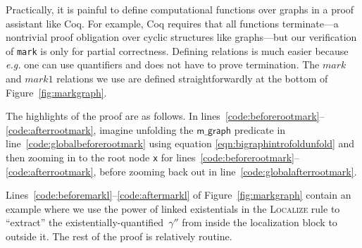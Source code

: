 \documentclass[acmsmall,screen]{acmart}
\newcommand{\li}[1]{{\texttt{\small #1}}}
\newcommand\hide[1]{}
\newcommand{\p}[1]{\ensuremath{\mathsf{#1}}} \newcommand{\m}[1]{\ensuremath{\mathit{#1}}} \newcommand{\ma}[1]{\ensuremath{\mathcal{#1}}} \let\ramify\lightning
\newcommand{\infrulestyle}[1]{\textsc{#1}}
\begin{document}
Practically, it is painful to define computational functions over graphs in a proof assistant like Coq.  For example, Coq requires that all functions terminate---a nontrivial proof obligation over cyclic structures like graphs---but our verification of \li{mark} is only for partial correctness.  Defining relations is much easier because \emph{e.g.} one can use quantifiers and does not have to prove termination.
The $\m{mark}$ and $\m{mark1}$ relations we use are defined straightforwardly at the bottom of Figure~\ref{fig:markgraph}.

The highlights of the proof are as follows.
In lines~\ref{code:beforerootmark}--\ref{code:afterrootmark}, imagine unfolding the \p{m\_graph} predicate in line~\ref{code:globalbeforerootmark} using equation \ref{eqn:bigraphintrofoldunfold} and then zooming in to the root node \li{x} for lines~\ref{code:beforerootmark}--\ref{code:afterrootmark}, before zooming back out in line~\ref{code:globalafterrootmark}.
\hide{\color{magenta}Here we upgrade the \infrulestyle{Ramify} rule in two important respects.  The first is the treatment of modified program variables.  Although prosaic, a robust treatment of modified variables is essential to verifying programs of any length.  The second is better handling of existential variables in the postconditions of localization blocks, which occur frequently when using relations in specifications.}
Lines~\ref{code:beforemarkl}--\ref{code:aftermarkl} of Figure~\ref{fig:markgraph} contain an example where we use the power of linked existentials in the \textsc{Localize} rule to ``extract'' the existentially-quantified~$\gamma''$ from inside the localization block to outside it.
The rest of the proof is relatively routine.
\end{document}
